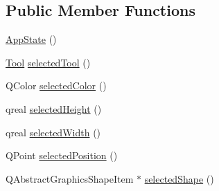 \subsection*{Public Member Functions}
\begin{DoxyCompactItemize}
\item 
\mbox{\hyperlink{classapp_1_1_app_state_a467580496a0d9b8641373c52b4cb3918}{App\+State}} ()
\item 
\mbox{\hyperlink{classapp_1_1_app_state_aa641298e5827611da2512591c4a0e966}{Tool}} \mbox{\hyperlink{classapp_1_1_app_state_adcdc7d3fa11e8aecd45baf4f4eb75ef7}{selected\+Tool}} ()
\item 
Q\+Color \mbox{\hyperlink{classapp_1_1_app_state_a05c87aa8f14b8689902f8aaa363adcc7}{selected\+Color}} ()
\item 
qreal \mbox{\hyperlink{classapp_1_1_app_state_aaddaf0dbd8c0c99c41968ac6a92709d8}{selected\+Height}} ()
\item 
qreal \mbox{\hyperlink{classapp_1_1_app_state_a31ce013025c446fc7c9f807fe17c0375}{selected\+Width}} ()
\item 
Q\+Point \mbox{\hyperlink{classapp_1_1_app_state_a9fda13b0d9336fc80b2913453694d4c6}{selected\+Position}} ()
\item 
Q\+Abstract\+Graphics\+Shape\+Item $\ast$ \mbox{\hyperlink{classapp_1_1_app_state_aef0851d3a3c35bb860e43f5dc682d9a7}{selected\+Shape}} ()
\end{DoxyCompactItemize}
